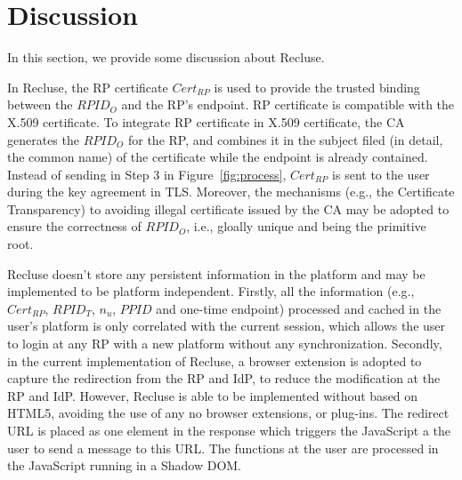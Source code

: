 \section{Discussion}
\label{sec:discussion}
In this section, we provide some discussion about Recluse.

 In Recluse, the RP certificate $Cert_{RP}$ is used to provide the trusted binding between the $RPID_O$ and the RP's endpoint. RP certificate is compatible with the X.509 certificate. To integrate RP certificate in X.509 certificate, the CA generates the $RPID_O$ for the RP, and combines it in the subject  filed (in detail, the common name)  of the certificate while the endpoint is already contained. Instead of sending  in Step 3 in Figure~\ref{fig:process}, $Cert_{RP}$  is sent to the user during the key agreement in TLS. Moreover, the mechanisms (e.g., the Certificate Transparency) to avoiding illegal certificate issued by the CA may be adopted to ensure the correctness of $RPID_O$, i.e., gloally unique and being the primitive root.

 Recluse doesn't store any persistent  information in the platform and may be implemented to be platform independent. Firstly, all the information (e.g., $Cert_{RP}$, $RPID_T$, $n_u$, $PPID$ and one-time endpoint) processed and cached in the user's platform is only correlated with the current session, which allows the user to login at any RP with a new platform without any synchronization. Secondly, in the current implementation of Recluse, a browser extension is adopted to capture the redirection from the RP and IdP, to reduce the modification at the RP and IdP. However, Recluse is able to be implemented without based on HTML5, avoiding the use of any no browser extensions, or plug-ins. The redirect URL is placed as one element in the response which triggers the JavaScript a the user to send a message to this URL. The functions at the user are processed in the JavaScript running in a Shadow DOM.
